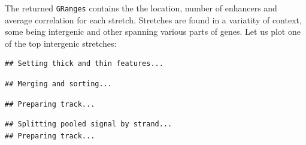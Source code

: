 \documentclass[9pt,a4paper,]{extarticle}
\newenvironment{Shaded}{\begin{snugshade}}{\end{snugshade}}
\newcommand{\KeywordTok}[1]{\textcolor[rgb]{0.13,0.29,0.53}{\textbf{{#1}}}}
\newcommand{\DataTypeTok}[1]{\textcolor[rgb]{0.13,0.29,0.53}{{#1}}}
\newcommand{\DecValTok}[1]{\textcolor[rgb]{0.00,0.00,0.81}{{#1}}}
\newcommand{\StringTok}[1]{\textcolor[rgb]{0.31,0.60,0.02}{{#1}}}
\newcommand{\CommentTok}[1]{\textcolor[rgb]{0.56,0.35,0.01}{\textit{{#1}}}}
\newcommand{\OtherTok}[1]{\textcolor[rgb]{0.56,0.35,0.01}{{#1}}}
\newcommand{\NormalTok}[1]{{#1}}
\begin{document}
The returned \texttt{GRanges} contains the the location, number of enhancers and average correlation for each stretch. Stretches are found in a variatity of context, some being intergenic and other spanning various parts of genes. Let us plot one of the top intergenic stretches:

\begin{Shaded}
\end{Shaded}

\begin{verbatim}
## Setting thick and thin features...
\end{verbatim}

\begin{verbatim}
## Merging and sorting...
\end{verbatim}

\begin{verbatim}
## Preparing track...
\end{verbatim}

\begin{Shaded}
\end{Shaded}

\begin{verbatim}
## Splitting pooled signal by strand...
## Preparing track...
\end{verbatim}
\end{document}
